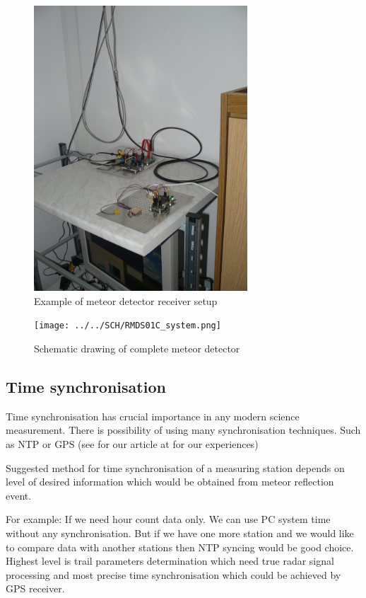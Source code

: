 \documentclass[12pt,a4paper,oneside]{article}
\begin{document}
\begin{figure} [htbp]
\begin{center}
\includegraphics [width=80mm] {./img/meteor-detector_receiver.JPG} 
\end{center}
\caption{Example of meteor detector receiver setup}
\end{figure}


\begin{figure} [htbp]
\begin{center}
\texttt{[image: ../../SCH/RMDS01C\_system.png]} 
\end{center}
\caption{Schematic drawing of complete meteor detector}
\end{figure}


\subsection{Time synchronisation}

Time synchronisation has crucial importance in any modern science measurement. There is possibility of using many synchronisation techniques. Such as NTP or GPS (see for our article at  for our experiences)

Suggested method for time synchronisation of a measuring station depends on level of desired information which would be obtained from meteor reflection event.    

For example: If we need hour count data only. We can use PC system time without any synchronisation. But if we have one more station and we would like to compare data with another stations then NTP syncing would be good choice.  Highest level is trail parameters determination which need true radar signal processing  and most precise time synchronisation which could be achieved by GPS receiver.
\end{document}
